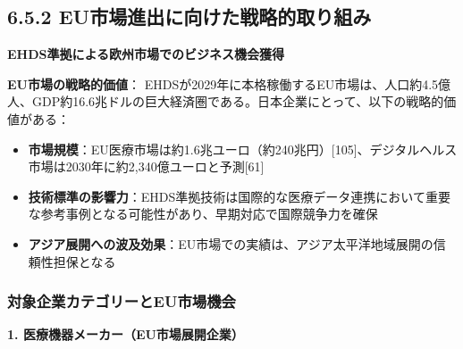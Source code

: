 \documentclass[
  a4paper,
  a4paper,
  11pt]{ltjsbook}
\providecommand{\tightlist}{%
  \setlength{\itemsep}{0pt}\setlength{\parskip}{0pt}}
\begin{document}
\subsection{6.5.2
EU市場進出に向けた戦略的取り組み}\label{euux5e02ux5834ux9032ux51faux306bux5411ux3051ux305fux6226ux7565ux7684ux53d6ux308aux7d44ux307f}

\textbf{EHDS準拠による欧州市場でのビジネス機会獲得}

\begin{tcolorbox}[enhanced jigsaw, toprule=.15mm, bottomtitle=1mm, coltitle=black, left=2mm, opacityback=0, arc=.35mm, colbacktitle=quarto-callout-important-color!10!white, colback=white, opacitybacktitle=0.6, bottomrule=.15mm, rightrule=.15mm, breakable, title=\textcolor{quarto-callout-important-color}{\faExclamation}\hspace{0.5em}{Important}, toptitle=1mm, titlerule=0mm, colframe=quarto-callout-important-color-frame, leftrule=.75mm]

\textbf{EU市場の戦略的価値}：
EHDSが2029年に本格稼働するEU市場は、人口約4.5億人、GDP約16.6兆ドルの巨大経済圏である。日本企業にとって、以下の戦略的価値がある：

\begin{itemize}
\tightlist
\item
  \textbf{市場規模}：EU医療市場は約1.6兆ユーロ（約240兆円）{[}105{]}、デジタルヘルス市場は2030年に約2,340億ユーロと予測{[}61{]}
\item
  \textbf{技術標準の影響力}：EHDS準拠技術は国際的な医療データ連携において重要な参考事例となる可能性があり、早期対応で国際競争力を確保
\item
  \textbf{アジア展開への波及効果}：EU市場での実績は、アジア太平洋地域展開の信頼性担保となる
\end{itemize}

\end{tcolorbox}

\subsubsection{対象企業カテゴリーとEU市場機会}\label{ux5bfeux8c61ux4f01ux696dux30abux30c6ux30b4ux30eaux30fcux3068euux5e02ux5834ux6a5fux4f1a}

\textbf{1. 医療機器メーカー（EU市場展開企業）}
\end{document}
